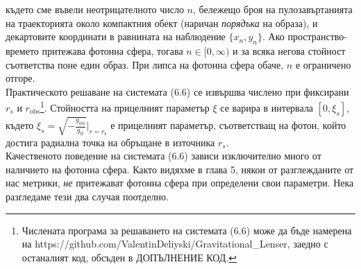 където сме въвели неотрицателното число $n$, бележещо броя на пулозавъртанията на траекторията около компактния обект (наричан \emph{порядъка} на образа), и декартовите координати в равнината на наблюдение $\{x_n,y_n\}$. Ако пространство-времето притежава фотонна сфера, тогава $n \in [0,\infty)$ и за всяка негова стойност съответства поне един образ. При липса на фотонна сфера обаче, $n$ е ограничено отгоре.\\ 

Практическото решаване на системата (6.6) се извършва числено при фиксирани $r_s$ и $r_\text{obs}$\footnote{ Числената програма за решаването на системата (6.6) може да бъде намерена на https://github.com/ValentinDeliyski/Gravitational\_Lenser, заедно с останалият код, обсъден в ДОПЪЛНЕНИЕ КОД.}. Стойността на прицелният параметър $\xi$ се варира в интервала $\left[0, \xi_s\right]$, където $\xi_s = \sqrt{-\frac{g_{\phi\phi}}{g_{tt}}}\big\vert_{r = r_\text{s}}$ е прицелният параметър, съответстващ на фотон, който достига радиална точка на обръщане в източника $r_s$.\\

Качественото поведение на системата (6.6) зависи изключително много от наличието на фотонна сфера. Както видяхме в глава 5, някои от разглежданите от нас метрики, \emph{не} притежават фотонна сфера при определени свои параметри. Нека разгледаме тези два случая поотделно.

